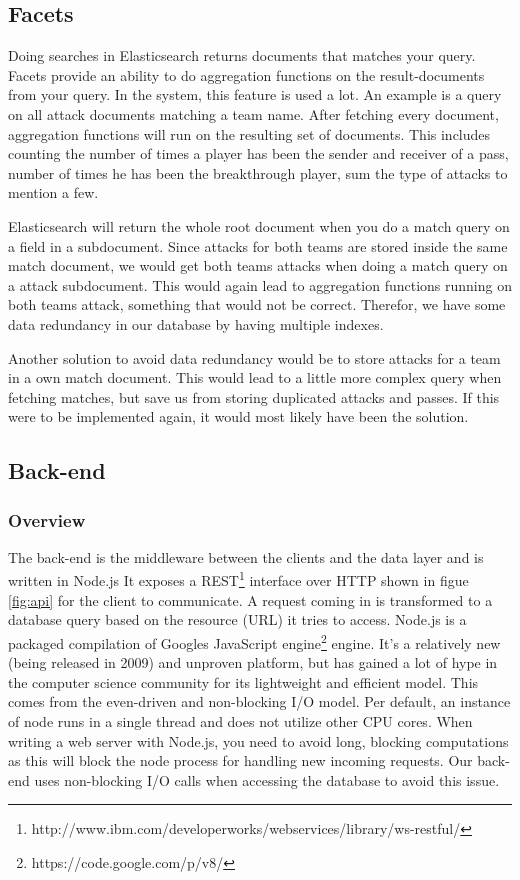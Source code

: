 \subsection{Facets}
\label{sec:facets}
Doing searches in Elasticsearch returns documents that matches your query. Facets provide an ability to do aggregation functions on the result-documents from your query. In the system, this feature is used a lot. An example is a query on all attack documents matching a team name. After fetching every document, aggregation functions will run on the resulting set of documents. This includes counting the number of times a player has been the sender and receiver of a pass, number of times he has been the breakthrough player, sum the type of attacks to mention a few. 

Elasticsearch will return the whole root document when you do a match query on a field in a subdocument. Since attacks for both teams are stored inside the same match document, we would get both teams attacks when doing a match query on a attack subdocument. This would again lead to aggregation functions running on both teams attack, something that would not be correct. Therefor, we have some data redundancy in our database by having multiple indexes.

Another solution to avoid data redundancy would be to store attacks for a team in a own match document. This would lead to a little more complex query when fetching matches, but save us from storing duplicated attacks and passes. If this were to be implemented again, it would most likely have been the solution.

\subsection{Back-end}

\subsubsection{Overview}	
The back-end is the middleware between the clients and the data layer and is written in Node.js\cite{node.js} It exposes a \ac{REST}\footnote{http://www.ibm.com/developerworks/webservices/library/ws-restful/} interface over \ac{HTTP} shown in figue \ref{fig:api} for the client to communicate. A request coming in is transformed to a database query based on the resource (URL) it tries to access. Node.js is a packaged compilation of Googles JavaScript engine\footnote{https://code.google.com/p/v8/} engine. It’s a relatively new (being released in 2009) and unproven platform, but has gained a lot of hype in the computer science community for its lightweight and efficient model. This comes from the even-driven and non-blocking I/O model. Per default, an instance of node runs in a single thread and does not utilize other CPU cores. When writing a web server with Node.js, you need to avoid long, blocking computations as this will block the node process for handling new incoming requests. Our back-end uses non-blocking I/O calls when accessing the database to avoid this issue.

